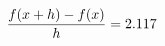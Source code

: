 \documentclass[preview]{standalone}
\begin{document}
\begin{align*}
\special{dvisvgm:raw <g id='unique000'>}\frac{f(x+h)-f(x)}{h} = 2.117\special{dvisvgm:raw </g>}
\end{align*}
\end{document}
